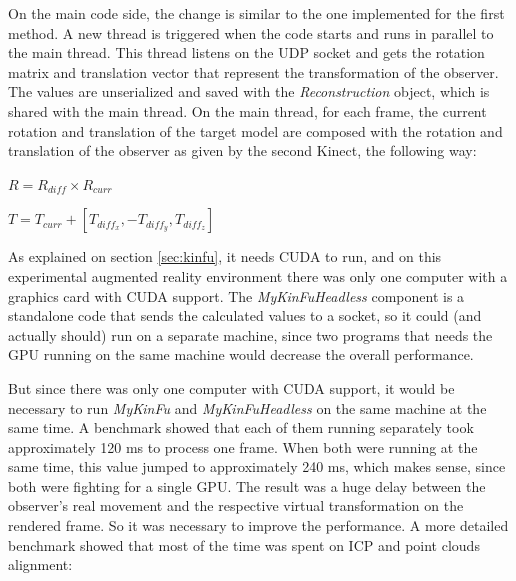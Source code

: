 \documentclass[msc, a4paper, classic, en]{ufbathesis}
\begin{document}
On the main code side, the change is similar to the one implemented for the first method. A new thread is triggered when the code starts and runs in parallel to the main thread. This thread listens on the UDP socket and gets the rotation matrix and translation vector that represent the transformation of the observer. The values are unserialized and saved with the \textit{Reconstruction} object, which is shared with the main thread. On the main thread, for each frame, the current rotation and translation of the target model are composed with the rotation and translation of the observer as given by the second Kinect, the following way:

\begin{center}
$R = R_{diff} \times R_{curr}$
\end{center}

\begin{center}
$T = T_{curr} + [T_{diff_x}, -T_{diff_y}, T_{diff_z}]$
\end{center}

As explained on section \ref{sec:kinfu}, it needs CUDA to run, and on this experimental augmented reality environment there was only one computer with a graphics card with CUDA support. The \textit{MyKinFuHeadless} component is a standalone code that sends the calculated values to a socket, so it could (and actually should) run on a separate machine, since two programs that needs the GPU running on the same machine would decrease the overall performance.

But since there was only one computer with CUDA support, it would be necessary to run \textit{MyKinFu} and \textit{MyKinFuHeadless} on the same machine at the same time. A benchmark showed that each of them running separately took approximately 120 ms to process one frame. When both were running at the same time, this value jumped to approximately 240 ms, which makes sense, since both were fighting for a single GPU. The result was a huge delay between the observer's real movement and the respective virtual transformation on the rendered frame. So it was necessary to improve the performance. A more detailed benchmark showed that most of the time was spent on ICP and point clouds alignment:
\end{document}
